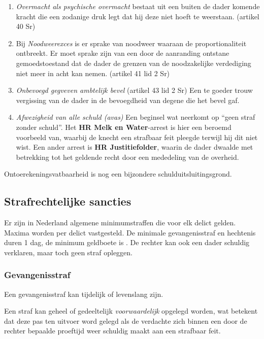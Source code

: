 \documentclass{article}
\begin{document}
\begin{enumerate}

  \item \emph{Overmacht als psychische overmacht} bestaat uit een buiten de
    dader komende kracht die een zodanige druk legt dat hij deze niet hoeft te
    weerstaan. (artikel 40 Sr)

  \item Bij \emph{Noodweerexces} is er sprake van noodweer waaraan de proportionaliteit
    ontbreekt. Er moet sprake zijn van een door de aanranding ontstane gemoedstoestand
    dat de dader de grenzen van de noodzakelijke verdediging niet meer in acht kan nemen.
    (artikel 41 lid 2 Sr)

  \item \emph{Onbevoegd gegveven ambtelijk bevel} (artikel 43 lid 2 Sr) Een te
    goeder trouw vergissing van de dader in de bevoegdheid van degene die het
    bevel gaf.

  \item \emph{Afwezigheid van alle schuld (avas)} Een beginsel wat neerkomt op
    ``geen straf zonder schuld''. Het \textbf{HR Melk en Water}-arrest is hier
    een beroemd voorbeeld van, waarbij de knecht een strafbaar feit pleegde
    terwijl hij dit niet wist. Een ander arrest is \textbf{HR Justitiefolder},
    waarin de dader dwaalde met betrekking tot het geldende recht door een
    mededeling van de overheid.

\end{enumerate}

Ontoerekeningsvatbaarheid is nog een bijzondere schulduitsluitingsgrond.

\subsection{Strafrechtelijke sancties}

Er zijn in Nederland algemene minimumstraffen die voor elk delict gelden.
Maxima worden per delict vastgesteld. De minimale gevangenisstraf en hechtenis
duren 1 dag, de minimum geldboete is . De rechter kan ook een dader
schuldig verklaren, maar toch geen straf opleggen.

\subsubsection{Gevangenisstraf}

Een gevangenisstraf kan tijdelijk of levenslang zijn.

Een straf kan geheel of gedeeltelijk \emph{voorwaardelijk} opgelegd worden, wat
betekent dat deze pas ten uitvoer word gelegd als de verdachte zich binnen een
door de rechter bepaalde proeftijd weer schuldig maakt aan een strafbaar feit.
\end{document}
